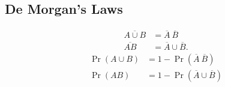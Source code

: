 \documentclass{article}
\begin{document}
\begin{multicols}{3}
    \subsection{De Morgan's Laws}
    \begin{align*}
        \overline{A \cup B} & = \overline{A} \ \overline{B}     \\
        \overline{AB}       & = \overline{A} \cup \overline{B}.
    \end{align*}
    \begin{align*}
        \Pr{\left( A \cup B \right)} & = 1 - \Pr{\left( \overline{A} \ \overline{B} \right)}    \\
        \Pr{\left( AB \right)}       & = 1 - \Pr{\left( \overline{A} \cup \overline{B} \right)}
    \end{align*}




\end{multicols}
\end{document}

